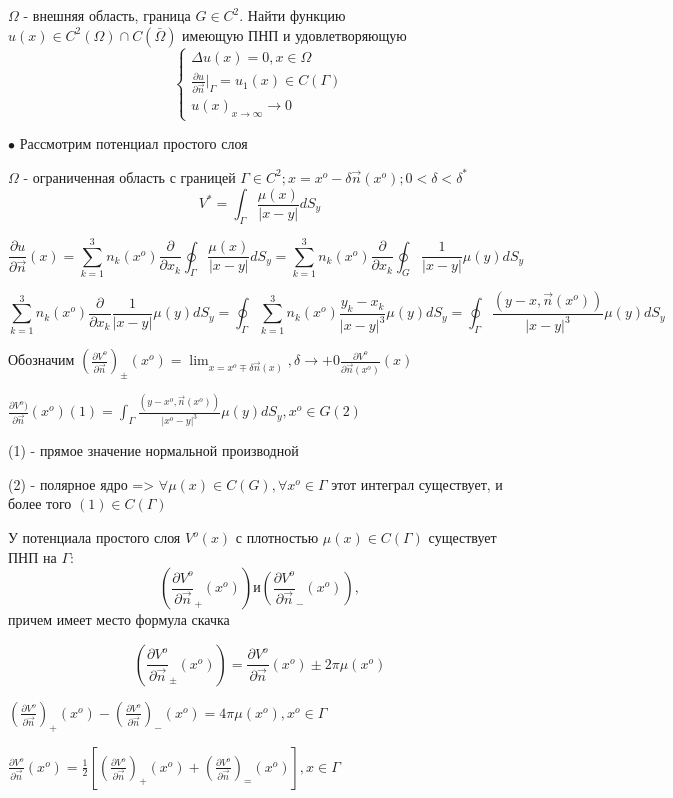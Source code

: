 \begin{theorem}
$\Omega$ - внешняя область, граница $G \in C^2$. Найти функцию $u(x) \in C^2(\Omega) \cap C(\bar{\Omega})$ имеющую ПНП и удовлетворяющую 
\begin{equation}
\begin{cases}
\Delta u(x) = 0, x \in \Omega
\\
\frac{\partial u}{\partial \vec{n}}|_{\Gamma} = u_1(x) \in C(\Gamma)
\\
u(x)_{x \to \infty} \to 0
\end{cases}
\end{equation}
\end{theorem}
$\bullet$ Рассмотрим потенциал простого слоя

$\Omega$ - ограниченная область с границей $\Gamma \in C^2; x = x^o - \delta \vec{n}(x^o); 0 < \delta < \delta^*$
  $$V^* = \int_{\Gamma} \frac{\mu(x)}{|x - y|}dS_y$$

$$\frac{\partial u}{\partial \vec{n}}(x) = \sum_{k = 1}^3 n_k(x^o) \frac{\partial}{\partial x_k}\oint_{\Gamma} \frac{\mu(x)}{|x - y|}dS_y = \sum_{k = 1}^3 n_k(x^o) \frac{\partial}{\partial x_k}\oint_G \frac{1}{|x - y|}\mu(y)dS_y$$

$$\sum_{k = 1}^3 n_k(x^o) \frac{\partial}{\partial x_k} \frac{1}{|x - y|}\mu(y)dS_y = \oint_{\Gamma} \sum_{k = 1}^3 n_k(x^o) \frac{y_k - x_k}{|x - y|^3}\mu(y)dS_y = \oint_{\Gamma} \frac{(y - x, \vec{n}(x^o))}{|x - y|^3}\mu(y)dS_y$$

Обозначим $\left( \frac{\partial V^o}{\partial \vec{n}} \right)_{\pm}(x^o) = \lim_{x = x^o \mp \delta \vec{n}(x)}, \delta \to +0 \frac{\partial V^o}{\partial \vec{n}(x^o)} (x)$

$\frac{\partial V^o)}{\partial \vec{n}}(x^o)(1) = \int_{\Gamma} \frac{(y - x^o, \vec{n}(x^o))}{|x^o - y|^3}\mu(y)dS_y, x^o \in G(2)$

(1) - прямое значение нормальной производной

(2) - полярное ядро => $\forall \mu(x) \in C(G), \forall x^o \in \Gamma$ этот интеграл существует, и более того $(1) \in C(\Gamma)$

\begin{theorem}
У потенциала простого слоя $V^o(x)$ с плотностью $\mu(x) \in C(\Gamma)$ существует ПНП на $\Gamma$: $$\left( \frac{\partial V^o}{\partial \vec{n}}_+(x^o)\right)
\text{и} \left(\frac{\partial V^o}{\partial \vec{n}}_-(x^o) \right),$$
причем имеет место формула скачка 

$$\left(\frac{\partial V^o}{\partial \vec{n}}_{\pm}(x^o) \right) = \frac{\partial V^o}{\partial \vec{n}}(x^o) \pm 2\pi \mu(x^o) $$
\end{theorem}
\begin{conseq}
$\left(\frac{\partial V^o}{\partial \vec{n}} \right)_+(x^o) - \left(\frac{\partial V^o}{\partial \vec{n}} \right)_-(x^o) = 4\pi \mu(x^o), x^o \in \Gamma$

$\frac{\partial V^o}{\partial \vec{n}}(x^o) = \frac{1}{2} \left[ \left(\frac{\partial V^o}{\partial \vec{n}} \right)_+(x^o) + \left(\frac{\partial V^o}{\partial \vec{n}} \right)_=(x^o)\right], x \in \Gamma$
\end{conseq}
